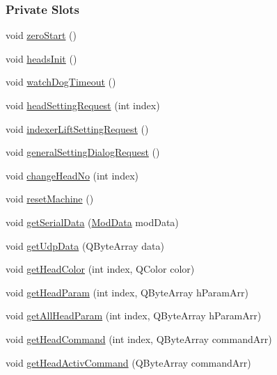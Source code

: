 \subsubsection*{Private Slots}
\begin{DoxyCompactItemize}
\item 
void \mbox{\hyperlink{classMainWindow_a9fc9d44f9d830e8f49d7052a88483d01}{zero\+Start}} ()
\item 
void \mbox{\hyperlink{classMainWindow_ac9861b0745a5505aaa5a6005a940e763}{heads\+Init}} ()
\item 
void \mbox{\hyperlink{classMainWindow_a5e694c3f8a020709ebd7e7e244655960}{watch\+Dog\+Timeout}} ()
\item 
void \mbox{\hyperlink{classMainWindow_ae823008e53cce4636c1776d86c946cf5}{head\+Setting\+Request}} (int index)
\item 
void \mbox{\hyperlink{classMainWindow_a867f15b0c134336e5477e80673f1903d}{indexer\+Lift\+Setting\+Request}} ()
\item 
void \mbox{\hyperlink{classMainWindow_a12f17b40fbfc42aa601dbfc583ea93dd}{general\+Setting\+Dialog\+Request}} ()
\item 
void \mbox{\hyperlink{classMainWindow_a2b45d2c72983565a0e0036054db498ce}{change\+Head\+No}} (int index)
\item 
void \mbox{\hyperlink{classMainWindow_a2d957a5c154ebce97484e8aa7fa2abb3}{reset\+Machine}} ()
\item 
void \mbox{\hyperlink{classMainWindow_a98db3a076389e7afc0f51bf980566851}{get\+Serial\+Data}} (\mbox{\hyperlink{serialport_8h_a2331c0232719069f0bce03c249d2eec6}{Mod\+Data}} mod\+Data)
\item 
void \mbox{\hyperlink{classMainWindow_ae1cb8ad1d2de77b497e219ce293cb053}{get\+Udp\+Data}} (Q\+Byte\+Array data)
\item 
void \mbox{\hyperlink{classMainWindow_a58b01de5b75f610847c9ad2b1c58165b}{get\+Head\+Color}} (int index, Q\+Color color)
\item 
void \mbox{\hyperlink{classMainWindow_ab019f061b5bdeba9339746d5092107ac}{get\+Head\+Param}} (int index, Q\+Byte\+Array h\+Param\+Arr)
\item 
void \mbox{\hyperlink{classMainWindow_a10d8d19caf33169392e8f4e8373fbb73}{get\+All\+Head\+Param}} (int index, Q\+Byte\+Array h\+Param\+Arr)
\item 
void \mbox{\hyperlink{classMainWindow_aa4e6c4af31a8f3189e2f6d6b945796b8}{get\+Head\+Command}} (int index, Q\+Byte\+Array command\+Arr)
\item 
void \mbox{\hyperlink{classMainWindow_ad5c320ccd4b6df9c8b4aec7914803b82}{get\+Head\+Activ\+Command}} (Q\+Byte\+Array command\+Arr)

\end{DoxyCompactItemize}
